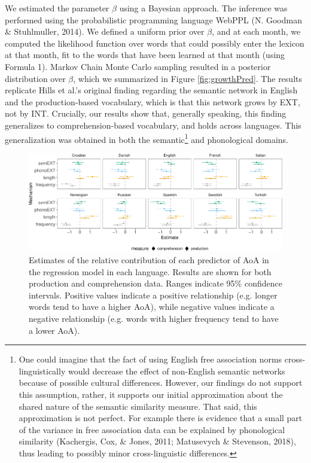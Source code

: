 \documentclass[english,floatsintext,man]{apa6}
\theoremstyle{definition}
\theoremstyle{definition}
\theoremstyle{definition}
\theoremstyle{remark}
\begin{document}
We estimated the parameter \(\beta\) using a Bayesian approach. The
inference was performed using the probabilistic programming language
WebPPL (N. Goodman \& Stuhlmuller, 2014). We defined a uniform prior
over \(\beta\), and at each month, we computed the likelihood function
over words that could possibly enter the lexicon at that month, fit to
the words that have been learned at that month (using Formula 1). Markov
Chain Monte Carlo sampling resulted in a posterior distribution over
\(\beta\), which we summarized in Figure \ref{fig:growthPred}. The
results replicate Hills et al.'s original finding regarding the semantic
network in English and the production-based vocabulary, which is that
this network grows by EXT, not by INT. Crucially, our results show that,
generally speaking, this finding generalizes to comprehension-based
vocabulary, and holds across languages. This generalization was obtained
in both the semantic\footnote{One could imagine that the fact of using
  English free association norms cross-linguistically would decrease the
  effect of non-English semantic networks because of possible cultural
  differences. However, our findings do not support this assumption,
  rather, it supports our initial approximation about the shared nature
  of the semantic similarity measure. That said, this approximation is
  not perfect. For example there is evidence that a small part of the
  variance in free association data can be explained by phonological
  similarity (Kachergis, Cox, \& Jones, 2011; Matusevych \& Stevenson,
  2018), thus leading to possibly minor cross-linguistic differences.}
and phonological domains.

\begin{figure}[!h]
\includegraphics[width=\textwidth]{ms_files/figure-latex/staticPred-1} \caption{Estimates of the relative contribution of each predictor of AoA in the regression model in each language. Results are shown for both production and comprehension data. Ranges indicate 95\% confidence intervals. Positive values indicate a positive relationship (e.g. longer words tend to have a higher AoA), while negative values indicate a negative relationship (e.g. words with higher frequency tend to have a lower AoA).}\label{fig:staticPred}
\end{figure}
\end{document}

